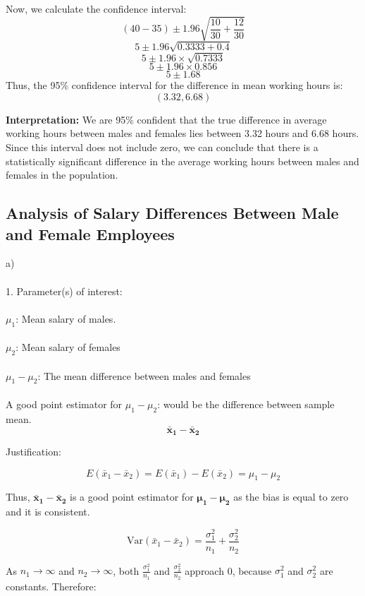 \documentclass[12pt,a4paper]{article}
\begin{document}
Now, we calculate the confidence interval:
\[
(40 - 35) \pm 1.96 \sqrt{\frac{10}{30} + \frac{12}{30}}
\]
\[
5 \pm 1.96 \sqrt{0.3333 + 0.4}
\]
\[
5 \pm 1.96 \times \sqrt{0.7333}
\]
\[
5 \pm 1.96 \times 0.856
\]
\[
5 \pm 1.68
\]
Thus, the 95\% confidence interval for the difference in mean working hours is:
\[
(3.32, 6.68)
\]

\textbf{Interpretation:}
We are 95\% confident that the true difference in average working hours between males and females lies between 3.32 hours and 6.68 hours. Since this interval does not include zero, we can conclude that there is a statistically significant difference in the average working hours between males and females in the population.
\newpage


\subsection{Analysis of Salary Differences Between Male and Female Employees}

a) \\\\
1. Parameter(s) of interest: \\\\
\textbf{$\mu_1$}: Mean salary of males. \\\\
\textbf{$\mu_2$}: Mean salary of females \\\\
\textbf{$\mu_1 - \mu_2$}: The mean difference between males and females \\\\

A good point estimator for {$\mu_1 - \mu_2$}: would be the difference between sample mean.  
\[
\boldsymbol{\bar{x}_1 - \bar{x}_2}
\]

Justification:

\[
E(\bar{x}_1 - \bar{x}_2) = E(\bar{x}_1) - E(\bar{x}_2) = \mu_1 - \mu_2
\]


Thus, \(\boldsymbol{\bar{x}_1 - \bar{x}_2}\) is a good point estimator for \(\boldsymbol{\mu_1 - \mu_2}\) as the bias is equal to zero and it is consistent. 

\[
\text{Var}(\bar{x}_1 - \bar{x}_2) = \frac{\sigma_1^2}{n_1} + \frac{\sigma_2^2}{n_2}
\]

As \(n_1 \to \infty\) and \(n_2 \to \infty\), both \(\frac{\sigma_1^2}{n_1}\) and \(\frac{\sigma_2^2}{n_2}\) approach 0, because \(\sigma_1^2\) and \(\sigma_2^2\) are constants. Therefore:
\end{document}
